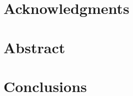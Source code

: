 \documentclass[a4paper,12pt]{report}
\begin{document}


    
    
                   
    

\fontsize {13pt}{16pt}
\selectfont

\chapter*{Acknowledgments}

\pagebreak

\chapter*{Abstract}

\pagebreak

\tableofcontents
\pagebreak



\pagebreak



\chapter{Conclusions}

\pagebreak


\end{document}
